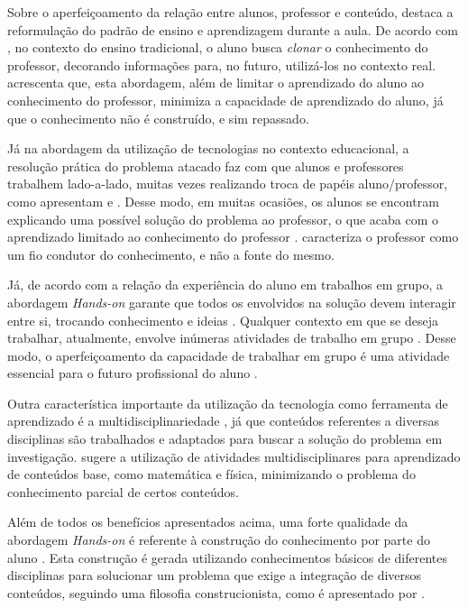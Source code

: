 Sobre o aperfeiçoamento da relação entre alunos, professor e conteúdo, \cite{construcionismoPapert} destaca a reformulação do padrão de ensino e aprendizagem durante a aula. De acordo com \cite{construcionismoPapert}, no contexto do ensino tradicional, o aluno busca \textit{clonar} o conhecimento do professor, decorando informações para, no futuro, utilizá-los no contexto real. \cite{roboticaEducativaEnsinoMedio} acrescenta que, esta abordagem, além de limitar o aprendizado do aluno ao conhecimento do professor, minimiza a capacidade de aprendizado do aluno, já que o conhecimento não é construído, e sim repassado.

Já na abordagem da utilização de tecnologias no contexto educacional, a resolução prática do problema atacado faz com que alunos e professores trabalhem lado-a-lado, muitas vezes realizando troca de papéis aluno/professor, como apresentam \cite{construcionismoPapert} e \cite{daMaquinaDeEnsinarAMaquinaDeAprender}. Desse modo, em muitas ocasiões, os alunos se encontram explicando uma possível solução do problema ao professor, o que acaba com o aprendizado limitado ao conhecimento do professor \cite{PCsEConstrucionismo}. \cite{construcionismoPapert} caracteriza o professor como um fio condutor do conhecimento, e não a fonte do mesmo.

Já, de acordo com a relação da experiência do aluno em trabalhos em grupo, a abordagem \textit{Hands-on} garante que todos os envolvidos na solução devem interagir entre si, trocando conhecimento e ideias \cite{teachingWithRoboticKit}. Qualquer contexto em que se deseja trabalhar, atualmente, envolve inúmeras atividades de trabalho em grupo \cite{teachingWithRoboticKit}. Desse modo, o aperfeiçoamento da capacidade de trabalhar em grupo é uma atividade essencial para o futuro profissional do aluno \cite{PCsEConstrucionismo}.

Outra característica importante da utilização da tecnologia como ferramenta de aprendizado é a multidisciplinariedade \cite{analiseFerramentaEnsinoComputacao}, já que conteúdos referentes a diversas disciplinas são trabalhados e adaptados para buscar a solução do problema em investigação. \cite{teachingWithRoboticKit} sugere a utilização de atividades multidisciplinares para aprendizado de conteúdos base, como matemática e física, minimizando o problema do conhecimento parcial de certos conteúdos.

Além de todos os benefícios apresentados acima, uma forte qualidade da abordagem \textit{Hands-on} é referente à construção do conhecimento por parte do aluno \cite{PCsEConstrucionismo}. Esta construção é gerada utilizando conhecimentos básicos de diferentes disciplinas para solucionar um problema que exige a integração de diversos conteúdos, seguindo uma filosofia construcionista, como é apresentado por \cite{construcionismoPapert}.
 

